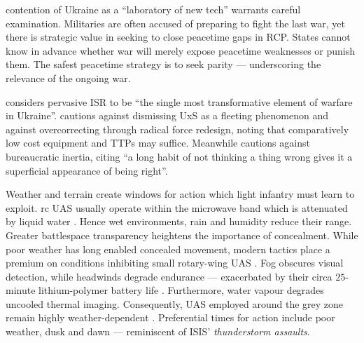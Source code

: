  contention of Ukraine as a ``laboratory of new tech'' warrants careful examination. Militaries are often accused of preparing to fight the last war, yet there is strategic value in seeking to close peacetime gaps in RCP. States cannot know in advance whether war will merely expose peacetime weaknesses or punish them. The safest peacetime strategy is to seek parity --- underscoring the relevance of the ongoing war.


\textcite[15]{watling_2025_10} considers pervasive ISR to be ``the single most transformative element of warfare in Ukraine''. \textcite{bob_tollast_participant_12} cautions against dismissing UxS as a fleeting phenomenon and against overcorrecting through radical force redesign, noting that comparatively low cost equipment and TTPs may suffice. Meanwhile \textcite{stu_lyle_participant_11} cautions against bureaucratic inertia, citing  ``a long habit of not thinking a thing wrong gives it a superficial appearance of being right''.


Weather and terrain create windows for action which light infantry must learn to exploit. \gls{rc} UAS usually operate within the microwave band which is attenuated by liquid water \parencite{vollmer}. Hence wet environments, rain and humidity reduce their range. Greater battlespace transparency heightens the importance of concealment. While poor weather has long enabled concealed movement, modern tactics place a premium on conditions inhibiting small rotary-wing UAS \parencite[3:15--4:56]{civdiv_6}. Fog obscures visual detection, while headwinds degrade endurance \parencite[0:10--0:56]{civdiv_3} --- exacerbated by their circa $25$-minute lithium-polymer battery life \parencite{civdiv_1,dan_participant_1}. Furthermore, water vapour degrades uncooled thermal imaging. Consequently, UAS employed around the grey zone remain highly weather-dependent \parencite[10]{kunertova_2024_2024_08,miller_2026}. Preferential times for action include poor weather, dusk and dawn --- reminiscent of ISIS' \textit{thunderstorm assaults}.

